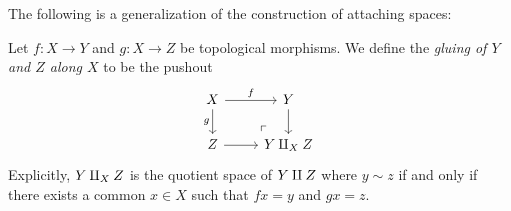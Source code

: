 The following is a generalization of the construction of attaching spaces:

\begin{definition}[Gluing]
\label{def:gluing-topological-spaces}
Let \(f: X \to Y\) and \(g: X \to Z\) be topological morphisms. We define the
\emph{gluing of \(Y\) and \(Z\) along \(X\)} to be the pushout
\[
\begin{tikzcd}
X \ar[d, "g"']
\ar[r, "f"]
\ar[rd, "\ulcorner", phantom, very near end]
&Y \ar[d] \\
Z \ar[r]
&Y \disj_X Z
\end{tikzcd}
\]
Explicitly, \(Y \amalg_X Z\) is the quotient space of \(Y \amalg Z\) where
\(y \sim z\) if and only if there exists a common \(x \in X\) such that
\(f x = y\) and \(g x = z\).
\end{definition}

